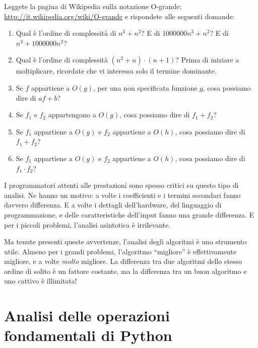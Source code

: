 \documentclass[10pt]{book}
\begin{document}
\vspace{0.2in}
\begin{exercise}

Leggete la pagina di Wikipedia sulla notazione O-grande: 
\url{http://it.wikipedia.org/wiki/O-grande} e rispondete alle seguenti domande:

\begin{enumerate}
\item Qual è l'ordine di complessità di $n^3 + n^2$?
E di $1000000 n^3 + n^2$?
E di $n^3 + 1000000 n^2$?

\item Qual è l'ordine di complessità $(n^2 + n) \cdot (n + 1)$?  Prima di iniziare a moltiplicare, ricordate che vi interessa solo il termine dominante.

\item Se $f$ appartiene a $O(g)$, per una non specificata funzione $g$, cosa possiamo dire di $af+b$?

\item Se $f_1$ e $f_2$ appartengono a $O(g)$, cosa possiamo dire di $f_1 + f_2$?

\item Se $f_1$ appartiene a $O(g)$
e $f_2$ appartiene a $O(h)$,
cosa possiamo dire di  $f_1 + f_2$?

\item Se  $f_1$ appartiene a $O(g)$ e $f_2$ appartiene a $O(h)$,
cosa possiamo dire di  $f_1 \cdot f_2$?
\end{enumerate}

\end{exercise}

I programmatori attenti alle prestazioni sono spesso critici su questo tipo di analisi. Ne hanno un motivo: a volte i coefficienti e i termini secondari fanno davvero differenza. E a volte i dettagli dell'hardware, del linguaggio di programmazione, e delle caratteristiche dell'input fanno una grande differenza. E per i piccoli problemi, l'analisi asintotica è irrilevante.

Ma tenute presenti queste avvertenze, l'analisi degli algoritmi è uno strumento utile. Almeno per i grandi problemi, l'algoritmo ``migliore'' è effettivamente migliore, e a volte {\em molto} migliore. La differenza tra due algoritmi dello stesso ordine di solito è un fattore costante, ma la differenza tra un buon algoritmo e uno cattivo è illimitata!



\section{Analisi delle operazioni fondamentali di Python}
\end{document}
